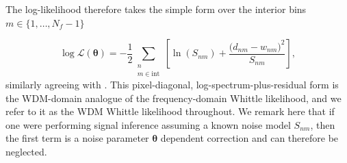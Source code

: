 \documentclass[twocolumn,preprintnumbers,
  superscriptaddress,
  nofootinbib,
  amsmath,
  amssymb,
  aps,
  prd,
  colorlinks=true,
  linkcolor=blue,
  urlcolor=blue,
  citecolor=blue,
  anchorcolor=blue
]{revtex4-2}
\begin{document}
The log-likelihood therefore takes the simple form over the interior bins $m \in \{1, \ldots, N_f - 1\}$

\begin{equation}
  \log \mathcal{L}(\boldsymbol{\theta})
  = -\frac{1}{2}\sum_{\substack{n \\ m\in\mathrm{int}}}
  \left[
    \ln(S_{nm})
    + \frac{\bigl(d_{nm}-w_{nm}\bigr)^2}{S_{nm}}
  \right],
\end{equation}
similarly agreeing with \cite{cornish_nonstationary_wdm}. This pixel-diagonal, log-spectrum-plus-residual form is the WDM-domain analogue of the frequency-domain Whittle likelihood, and we refer to it as the WDM Whittle likelihood throughout. We remark here that if one were performing signal inference assuming a known noise model $S_{nm}$, then the first term is a noise parameter $\boldsymbol{\theta}$ dependent correction and can therefore be neglected.
\end{document}

